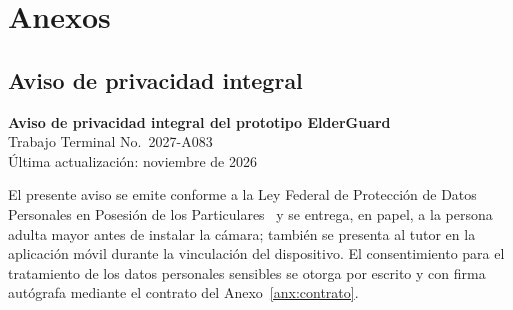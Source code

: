 \documentclass[12pt,a4paper,oneside]{book}
\theoremstyle{plain}
\theoremstyle{definition}
\theoremstyle{remark}
\begin{document}

\providecommand{\correoAviso}{\textbf{[correo de contacto del proyecto]}}
\providecommand{\domicilioAviso}{Escuela Superior de Cómputo del IPN, Av.~Juan de Dios Bátiz s/n, esquina Av.~Miguel Othón de Mendizábal, Col.~Lindavista, Alcaldía Gustavo A.~Madero, C.P.~07738, Ciudad de México}

\providecommand{\campo}[1][6cm]{\rule{#1}{0.4pt}}
\providecommand{\casilla}{\fbox{\rule{0pt}{0.5em}\rule{0.5em}{0pt}}}
\providecommand{\bloqueFirma}[2]{%
  \begin{minipage}[t]{0.46\textwidth}\centering
    \vspace{1.8cm}
    \rule{\linewidth}{0.4pt}\\[2pt]
    #1\\
    {\small #2}
  \end{minipage}}

\cleardoublepage
\chapter*{Anexos}
\setcounter{section}{0}
\setcounter{table}{0}
\renewcommand{\thesection}{\Alph{section}}
\renewcommand{\thetable}{\thesection.\arabic{table}}

\section{Aviso de privacidad integral}
\label{anx:aviso}

\begin{center}
\textbf{Aviso de privacidad integral del prototipo ElderGuard}\\
Trabajo Terminal No.~2027-A083\\
{\small Última actualización: noviembre de 2026}
\end{center}

El presente aviso se emite conforme a la Ley Federal de Protección de Datos Personales en Posesión de los Particulares~\cite{LFPDPPP} y se entrega, en papel, a la persona adulta mayor antes de instalar la cámara; también se presenta al tutor en la aplicación móvil durante la vinculación del dispositivo. El consentimiento para el tratamiento de los datos personales sensibles se otorga por escrito y con firma autógrafa mediante el contrato del Anexo~\ref{anx:contrato}.
\end{document}
